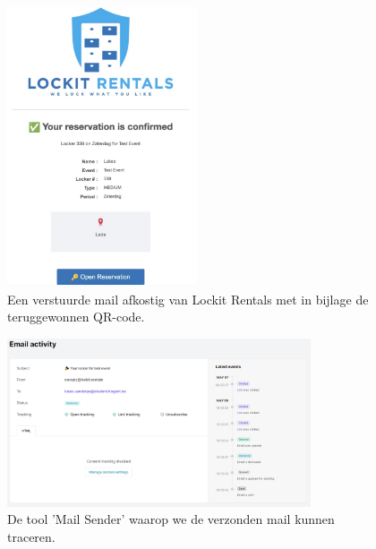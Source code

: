 \begin{figure}[h]
    \centering
    \includegraphics[width=0.5\textwidth]{graphics/F34_mailQR-code.jpg}
    \captionsetup{justification=centering, singlelinecheck=false}
    
    \caption{Een verstuurde mail afkostig van Lockit Rentals met in bijlage de teruggewonnen QR-code.}
    \label{fig:resultatEmailQR-code}
\end{figure}

\begin{figure}[h]
    \centering
    \includegraphics[width=0.8\textwidth]{graphics/F35_mailSender.png}
        \captionsetup{justification=centering,singlelinecheck=false}
    \caption{De tool 'Mail Sender' waarop we de verzonden mail kunnen traceren.}
    \label{fig:resultaatEmailSender}
\end{figure}











